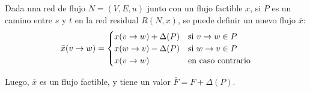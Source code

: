 \label{teorema-camino-aumento}
\begin{theorem*}
    Dada una red de flujo $N = (V, E, u)$ junto con un flujo factible $x$, si $P$ es un camino entre $s$ y $t$ en la red residual $R(N, x)$, se puede definir un nuevo flujo $\bar{x}$:
    $$
        \bar{x}(v \rightarrow w) =
        \begin{cases}
            x(v \rightarrow w) + \Delta(P) & \text{si } v \rightarrow w \in P \\
            x(w \rightarrow v) - \Delta(P) & \text{si } w \rightarrow v \in P \\
            x(v \rightarrow w)             & \text{en caso contrario}
        \end{cases}
    $$

    Luego, $\bar{x}$ es un flujo factible, y tiene un valor $\bar{F} = F + \Delta(P)$.
\end{theorem*}
